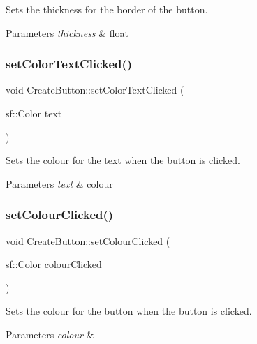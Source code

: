 Sets the thickness for the border of the button. 


\begin{DoxyParams}{Parameters}
{\em thickness} & float \\
\hline
\end{DoxyParams}
\mbox{\label{class_create_button_a835d18ba262b902c7143966902082a68}} 
\subsubsection{\texorpdfstring{set\+Color\+Text\+Clicked()}{setColorTextClicked()}}
{\footnotesize\ttfamily void Create\+Button\+::set\+Color\+Text\+Clicked (\begin{DoxyParamCaption}\item[{sf\+::\+Color}]{text }\end{DoxyParamCaption})}



Sets the colour for the text when the button is clicked. 


\begin{DoxyParams}{Parameters}
{\em text} & colour \\
\hline
\end{DoxyParams}
\mbox{\label{class_create_button_af36c48ee1c7f440fba316e8e83b689b7}} 
\subsubsection{\texorpdfstring{set\+Colour\+Clicked()}{setColourClicked()}}
{\footnotesize\ttfamily void Create\+Button\+::set\+Colour\+Clicked (\begin{DoxyParamCaption}\item[{sf\+::\+Color}]{colour\+Clicked }\end{DoxyParamCaption})}



Sets the colour for the button when the button is clicked. 


\begin{DoxyParams}{Parameters}
{\em colour} & \\
\hline
\end{DoxyParams}
\mbox{\label{class_create_button_a2fed0a4b7ffe6b274840d0c166547277}} 

